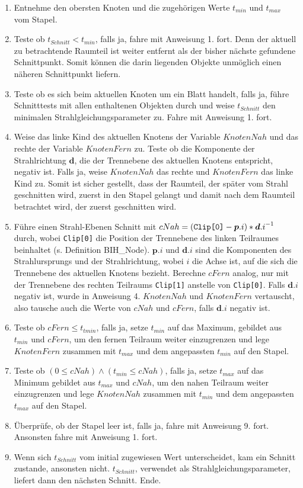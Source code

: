 \begin{enumerate}
    \item Entnehme den obersten Knoten und die zugehörigen Werte \( t_{min} \) und \( t_{max} \) vom Stapel.
    \item Teste ob \( t_{Schnitt} < t_{min} \), falls ja, fahre mit Anweisung 1. fort. Denn der aktuell zu betrachtende Raumteil ist weiter entfernt als der bisher nächste gefundene Schnittpunkt. Somit können die darin liegenden Objekte unmöglich einen näheren Schnittpunkt liefern.
    \item Teste ob es sich beim aktuellen Knoten um ein Blatt handelt, falls ja, führe Schnitttests mit allen enthaltenen Objekten durch und weise \( t_{Schnitt} \) den minimalen Strahlgleichungsparameter zu. Fahre mit Anweisung 1. fort.
    \item Weise das linke Kind des aktuellen Knotens der Variable \( {KnotenNah } \) und das rechte der Variable \( KnotenFern \) zu. Teste ob die Komponente der Strahlrichtung \( \boldsymbol{d} \), die der Trennebene des aktuellen Knotens entspricht, negativ ist. Falls ja, weise \( KnotenNah \) das rechte und \( KnotenFern \) das linke Kind zu. Somit ist sicher gestellt, dass der Raumteil, der später vom Strahl geschnitten wird, zuerst in den Stapel gelangt und damit nach dem Raumteil betrachtet wird, der zuerst geschnitten wird.
    \item Führe einen Strahl-Ebenen Schnitt mit \( cNah = (\verb|Clip[0]|
    - \boldsymbol{p}.i) * {\boldsymbol{d}.i}^{-1} \) durch, wobei \verb|Clip[0]| die Position der Trennebene des linken Teilraumes beinhaltet (s. Definition BIH\_Node). \( \boldsymbol{p}.i \) und \( \boldsymbol{d}.i \) sind die Komponenten des Strahlursprungs und der Strahlrichtung, wobei \( i \) die Achse ist, auf die sich die Trennebene des aktuellen Knotens bezieht. Berechne \( cFern \) analog, nur mit der Trennebene des rechten Teilraums \verb|Clip[1]| anstelle von \verb|Clip[0]|. Falls \( \boldsymbol{d}.i \)  negativ ist, wurde in Anweisung 4. \( KnotenNah \) und \( KnotenFern \) vertauscht, also tausche auch die Werte von \( cNah \) und \( cFern \), falls \( \boldsymbol{d}.i \) negativ ist.
    \item Teste ob \( cFern \le t_{tmin} \), falls ja, setze \( t_{min} \) auf das Maximum, gebildet aus \( t_{min} \text{ und } cFern\), um den fernen Teilraum weiter einzugrenzen und lege \( KnotenFern \) zusammen mit \( t_{max} \) und dem angepassten \( t_{min} \) auf den Stapel.
    \item Teste ob \( (0 \le cNah) \land (t_{min} \le cNah) \), falls ja, setze \( t_{max} \) auf das Minimum gebildet aus \( t_{max} \) und \( cNah \), um den nahen Teilraum weiter einzugrenzen und lege \( KnotenNah \) zusammen mit \( t_{min} \) und dem angepassten \( t_{max} \) auf den Stapel.
    \item Überprüfe, ob der Stapel leer ist, falls ja, fahre mit Anweisung 9. fort. Ansonsten fahre mit Anweisung 1. fort.
    \item Wenn sich \( t_{Schnitt} \) vom initial zugewiesen Wert unterscheidet, kam ein Schnitt zustande, ansonsten nicht. \( t_{Schnitt} \), verwendet als Strahlgleichungsparameter, liefert dann den nächsten Schnitt. Ende.
    

\end{enumerate}
